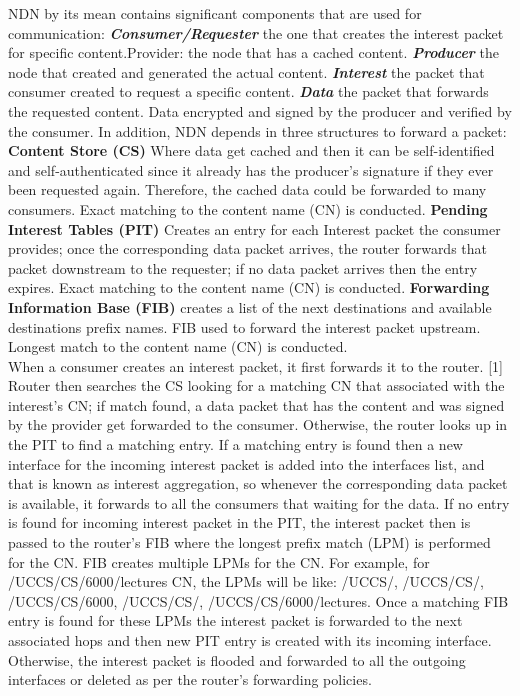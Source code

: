 \documentclass[twocolumn]{article}
\begin{document}
NDN by its mean contains significant components that are used for communication: \textbf{\textit{Consumer/Requester}} the one that creates the interest packet for specific content.Provider: the node that has a cached content. \textbf{\textit{Producer}} the node that created and generated the actual content. \textbf{\textit{Interest}} the packet that consumer created to request a specific content. \textbf{\textit{Data}} the packet that forwards the requested content. Data encrypted and signed by the producer and verified by the consumer. In addition, NDN depends in three structures to forward a packet: \textbf{Content Store (CS)} Where data get cached and then it can be self-identified and self-authenticated since it already has the producer's signature if they ever been requested again. Therefore, the cached data could be forwarded to many consumers. Exact matching to the content name (CN) is conducted. \textbf{Pending Interest Tables (PIT)} Creates an entry for each Interest packet the consumer provides; once the corresponding data packet arrives, the router forwards that packet downstream to the requester; if no data packet arrives then the entry expires. Exact matching to the content name (CN) is conducted. \textbf{Forwarding Information Base (FIB)} creates a list of the next destinations and available destinations prefix names. FIB used to forward the interest packet upstream. Longest match to the content name (CN) is conducted.\\
When a consumer creates an interest packet, it first forwards it to the router. [1] Router then searches the CS looking for a matching CN that associated with the interest's CN; if match found, a data packet that has the content and was signed by the provider get forwarded to the consumer. Otherwise, the router looks up in the PIT to find a matching entry. If a matching entry is found then a new interface for the incoming interest packet is added into the interfaces list, and that is known as interest aggregation, so whenever the corresponding data packet is available, it forwards to all the consumers that waiting for the data. If no entry is found for incoming interest packet in the PIT, the interest packet then is passed to the router's FIB where the longest prefix match (LPM) is performed for the CN. FIB creates multiple LPMs for the CN. For example, for /UCCS/CS/6000/lectures CN, the LPMs will be like: /UCCS/, /UCCS/CS/, /UCCS/CS/6000, /UCCS/CS/, /UCCS/CS/6000/lectures. Once a matching FIB entry is found for these LPMs the interest packet is forwarded to the next associated hops and then new PIT entry is created with its incoming interface. Otherwise, the interest packet is flooded and forwarded to all the outgoing interfaces or deleted as per the router's forwarding policies.
\end{document}
